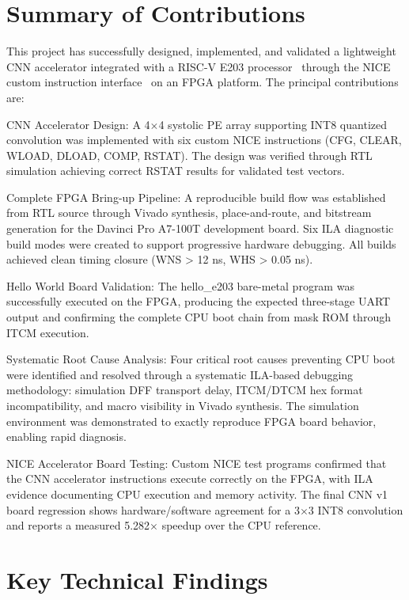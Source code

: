 

\section{Summary of Contributions}\label{sec:6_1}

This project has successfully designed, implemented, and validated a lightweight CNN accelerator integrated with a RISC-V E203 processor~\cite{NUCLEI_E203} through the NICE custom instruction interface~\cite{NUCLEI_NICE} on an FPGA platform. The principal contributions are:


CNN Accelerator Design: A 4$\times$4 systolic PE array supporting INT8 quantized convolution was implemented with six custom NICE instructions (CFG, CLEAR, WLOAD, DLOAD, COMP, RSTAT). The design was verified through RTL simulation achieving correct RSTAT results for validated test vectors.


Complete FPGA Bring-up Pipeline: A reproducible build flow was established from RTL source through Vivado synthesis, place-and-route, and bitstream generation for the Davinci Pro A7-100T development board. Six ILA diagnostic build modes were created to support progressive hardware debugging. All builds achieved clean timing closure (WNS > 12 ns, WHS > 0.05 ns).


Hello World Board Validation: The hello\_e203 bare-metal program was successfully executed on the FPGA, producing the expected three-stage UART output and confirming the complete CPU boot chain from mask ROM through ITCM execution.


Systematic Root Cause Analysis: Four critical root causes preventing CPU boot were identified and resolved through a systematic ILA-based debugging methodology: simulation DFF transport delay, ITCM/DTCM hex format incompatibility, and macro visibility in Vivado synthesis. The simulation environment was demonstrated to exactly reproduce FPGA board behavior, enabling rapid diagnosis.


NICE Accelerator Board Testing: Custom NICE test programs confirmed that the CNN accelerator instructions execute correctly on the FPGA, with ILA evidence documenting CPU execution and memory activity. The final CNN v1 board regression shows hardware/software agreement for a 3$\times$3 INT8 convolution and reports a measured 5.282$\times$ speedup over the CPU reference.


\section{Key Technical Findings}\label{sec:6_2}

